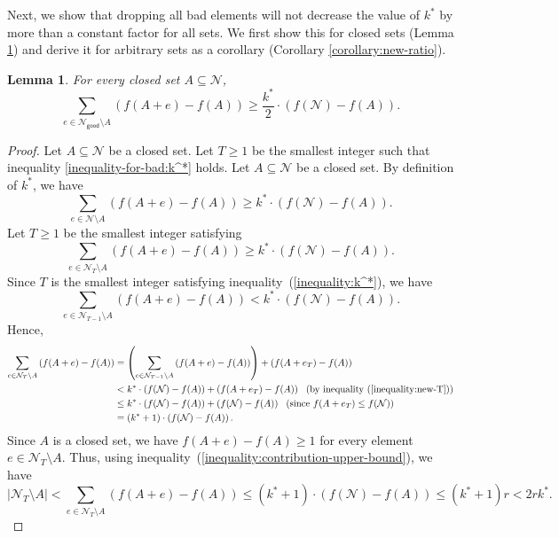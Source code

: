 \documentclass[11pt]{article}
\newtheorem{lemma}{Lemma}
\theoremstyle{definition}
\newcommand{\good}{\mathsf{good}}
\begin{document}
Next, we show that dropping all bad elements will not decrease the value of $k^*$ by more than a constant factor for all sets. We first show this for closed sets (Lemma \ref{lemma:new-ratio-closed}) and derive it for arbitrary sets as a corollary (Corollary \ref{corollary:new-ratio}). 
\begin{lemma}\label{lemma:new-ratio-closed}
    For every closed set $A\subseteq \mathcal{N}$,
    $$\sum_{e\in \mathcal{N}_{\good}\setminus A} \left(f(A+e)-f(A)\right) \geq \frac{k^*}{2}\cdot \left(f(\mathcal{N})-f(A)\right).$$
\end{lemma}
\begin{proof}
Let $A\subseteq \mathcal{N}$ be a closed set. 
Let $T\geq 1$ be the smallest integer such that inequality \eqref{inequality-for-bad:k^*} holds. 
    \iffalse
    Let $A\subseteq \mathcal{N}$ be a closed set. By definition of $k^*$, we have
    $$
    \sum_{e\in \mathcal{N}\setminus A} \left(f(A+e)-f(A)\right) \geq k^*\cdot \left(f(\mathcal{N})-f(A)\right).
    $$
    Let $T\geq 1$ be the smallest integer satisfying  
    \begin{equation}\label{inequality:k^*}
    \sum_{e\in \mathcal{N}_T\setminus A} \left(f(A+e)-f(A)\right) \geq k^*\cdot \left(f(\mathcal{N})-f(A)\right).
    \end{equation}
    Since $T$ is the smallest integer satisfying inequality~(\ref{inequality:k^*}), we have
    \begin{equation}\label{inequality:new-T}
        \sum_{e\in \mathcal{N}_{T-1}\setminus A} \left(f(A+e)-f(A)\right) < k^*\cdot \left(f(\mathcal{N})-f(A)\right).
    \end{equation}
    Hence,
    \begin{align}\label{inequality:contribution-upper-bound}
        \sum_{e\in \mathcal{N}_T\setminus A} \left(f(A+e)-f(A)\right) &= \left(\sum_{e\in \mathcal{N}_{T-1}\setminus A} \left(f(A+e)-f(A)\right)\right)+\left(f(A+e_{T})-f(A)\right) \notag \\
        &< k^*\cdot \left(f(\mathcal{N})-f(A)\right)+\left(f(A+e_{T})-f(A)\right) \ \ \text{(by inequality~(\ref{inequality:new-T}))} \notag \\
        &\leq k^*\cdot \left(f(\mathcal{N})-f(A)\right)+\left(f(\mathcal{N})-f(A)\right) \ \ \text{(since $f(A+e_T)\leq f(\mathcal{N})$)} \notag \\
        &= (k^*+1)\cdot \left(f(\mathcal{N})-f(A)\right).
    \end{align}
    Since $A$ is a closed set, we have $f(A+e)-f(A)\geq 1$ for every element $e\in \mathcal{N}_T\setminus A$. Thus, using inequality~(\ref{inequality:contribution-upper-bound}), we have
    \begin{equation}\label{inequality:size-upper-bound}
        |\mathcal{N}_T\setminus A| < \sum_{e\in \mathcal{N}_T\setminus A} \left(f(A+e)-f(A)\right) \leq (k^*+1)\cdot (f(\mathcal{N})-f(A)) \leq (k^*+1)r <2rk^*.
    \end{equation}
    

\end{proof}
\end{document}
